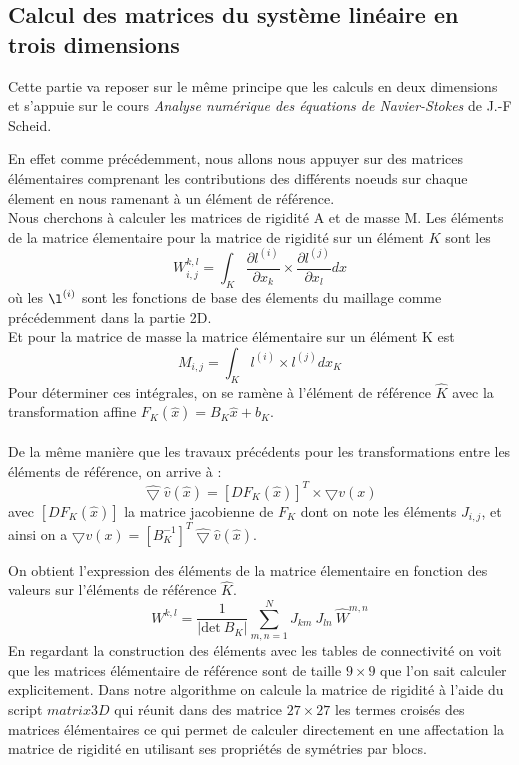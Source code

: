 \documentclass[a4paper,12pt,titlepage]{report}
\begin{document}
\begin{onehalfspace}
\newpage
\subsection{Calcul des matrices du système linéaire en trois dimensions}

Cette partie va reposer sur le même principe que les calculs en deux dimensions et s'appuie sur le cours \textit{Analyse numérique des équations de
Navier-Stokes} de J.-F Scheid.

En effet comme précédemment, nous allons nous appuyer sur des matrices élémentaires comprenant les contributions des différents noeuds sur chaque élement en nous ramenant à un élément de référence.  \\
Nous cherchons à calculer les matrices de rigidité A et de masse M.
Les éléments de la matrice élementaire pour la matrice de rigidité sur un élément $K$ sont les 
\[
W_{i,j}^{k,l}=\int_K \frac{\partial l^{(i)}}{\partial x_k} \times \frac{\partial l^{(j)}}{\partial x_l}dx
\]
où les  $\l^{(i)}$ sont les fonctions de base des élements du maillage comme précédemment dans la partie 2D. \\
Et pour la matrice de masse la matrice élémentaire sur un élément K est
\[
M_{i,j}=\int_K l^{(i)}\times l^{(j)}dx
_K 
\]
 Pour déterminer ces intégrales, on se ramène à l'élément de référence $\hat{K}$ avec la transformation affine
$F_K(\hat{x})=B_K \hat{x} + b_K$.
\\
\\
De la même manière que les travaux précédents pour les transformations entre les éléments de référence, on arrive à :
\[
\hat{\bigtriangledown}\hat{v}(\hat{x})= [DF_K(\hat{x})]^T\times \bigtriangledown v(x)
\]
avec $[DF_K(\hat{x})]$ la matrice jacobienne de $F_K$ dont on note les éléments $J_{i,j}$, et ainsi on a $\bigtriangledown v(x) = [B_K^{-1}]^T\hat{\bigtriangledown} \hat{v}(\hat{x})$.

On obtient l'expression des éléments de la matrice élementaire en fonction des valeurs sur l'éléments de référence $\hat{K}$.
\[
W^{k,l} = \frac{1}{|\text{det} \ B_K|}\sum_{m,n=1}^{N} J_{km}\ J_{ln}\ \hat{W}^{m,n}
\]
En regardant la construction des éléments avec les tables de connectivité on voit que les matrices élémentaire de référence sont de taille $9\times 9$ que l'on sait calculer explicitement.
Dans notre algorithme on calcule la matrice de rigidité à l'aide du script $matrix3D$ qui réunit dans des matrice $27\times 27$ les termes croisés des matrices élémentaires ce qui permet de calculer directement en une affectation la matrice de rigidité en utilisant ses propriétés de symétries par blocs.


\end{onehalfspace}
\end{document}
